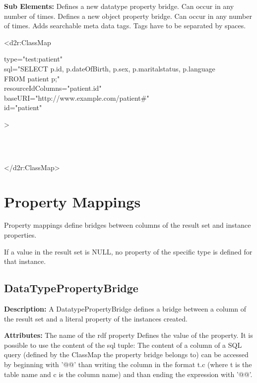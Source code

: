 \textbf{Sub Elements:} \newline
{}
Defines a new datatype property bridge. Can occur in any number of times.
\EndAttribute
{}
Defines a new object property bridge. Can occur in any number of times.
\EndAttribute
{}
Adds searchable meta data tags. Tags have to be separated by spaces.
\EndAttribute
\begin{ExampleBox}
	<d2r:ClassMap 
	\begin{indention}{1cm}
		type="test:patient"\\
		sql="SELECT p.id, p.dateOfBirth, p.sex, p.maritalstatus, p.language\\ 
		FROM patient p;"\\
		resourceIdColumns="patient.id"\\
		baseURI="http://www.example.com/patient\#"\\
		id="patient"
	\end{indention}
	>

	\begin{indention}{1cm}
		\\
		\\
	\end{indention}	
	
	</d2r:ClassMap>
\end{ExampleBox}

\section{Property Mappings}
Property mappings define bridges between columns of the result set and instance
properties.

If a value in the result set is NULL, no property of the specific type is defined for
that instance.

\subsection{DataTypePropertyBridge}
\textbf{Description:} \newline
A DatatypePropertyBridge defines a bridge between a column of the result set and a literal property of the instances created.

\textbf{Attributes:} \newline
{}
The name of the rdf property
\EndAttribute
\label{patternLabel}
Defines the value of the property. It is possible to use the content of the sql tuple: The content of a column of a SQL query (defined by the ClassMap the property bridge belongs to) can be accessed by beginning with '@@' than writing the column in the format t.c (where t is the table name and c is the column name) and than ending the expression with '@@'.

